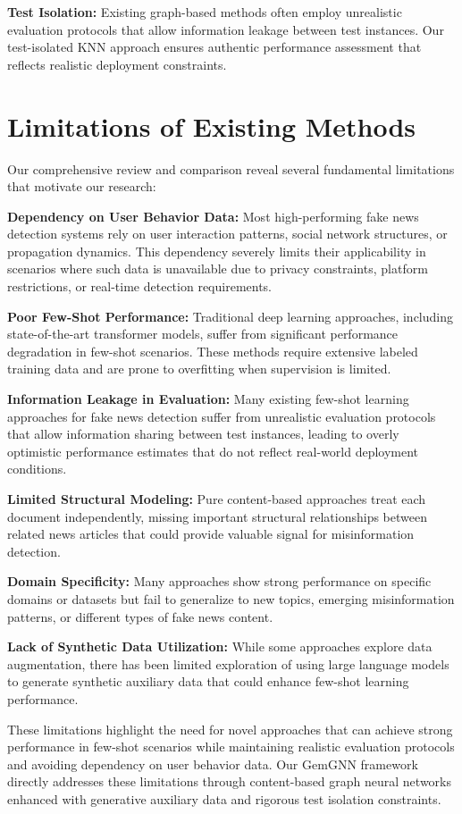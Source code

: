\textbf{Test Isolation:} Existing graph-based methods often employ unrealistic evaluation protocols that allow information leakage between test instances. Our test-isolated KNN approach ensures authentic performance assessment that reflects realistic deployment constraints.

\section{Limitations of Existing Methods}

Our comprehensive review and comparison reveal several fundamental limitations that motivate our research:

\textbf{Dependency on User Behavior Data:} Most high-performing fake news detection systems rely on user interaction patterns, social network structures, or propagation dynamics. This dependency severely limits their applicability in scenarios where such data is unavailable due to privacy constraints, platform restrictions, or real-time detection requirements.

\textbf{Poor Few-Shot Performance:} Traditional deep learning approaches, including state-of-the-art transformer models, suffer from significant performance degradation in few-shot scenarios. These methods require extensive labeled training data and are prone to overfitting when supervision is limited.

\textbf{Information Leakage in Evaluation:} Many existing few-shot learning approaches for fake news detection suffer from unrealistic evaluation protocols that allow information sharing between test instances, leading to overly optimistic performance estimates that do not reflect real-world deployment conditions.

\textbf{Limited Structural Modeling:} Pure content-based approaches treat each document independently, missing important structural relationships between related news articles that could provide valuable signal for misinformation detection.

\textbf{Domain Specificity:} Many approaches show strong performance on specific domains or datasets but fail to generalize to new topics, emerging misinformation patterns, or different types of fake news content.

\textbf{Lack of Synthetic Data Utilization:} While some approaches explore data augmentation, there has been limited exploration of using large language models to generate synthetic auxiliary data that could enhance few-shot learning performance.

These limitations highlight the need for novel approaches that can achieve strong performance in few-shot scenarios while maintaining realistic evaluation protocols and avoiding dependency on user behavior data. Our GemGNN framework directly addresses these limitations through content-based graph neural networks enhanced with generative auxiliary data and rigorous test isolation constraints.

\EndChapter
